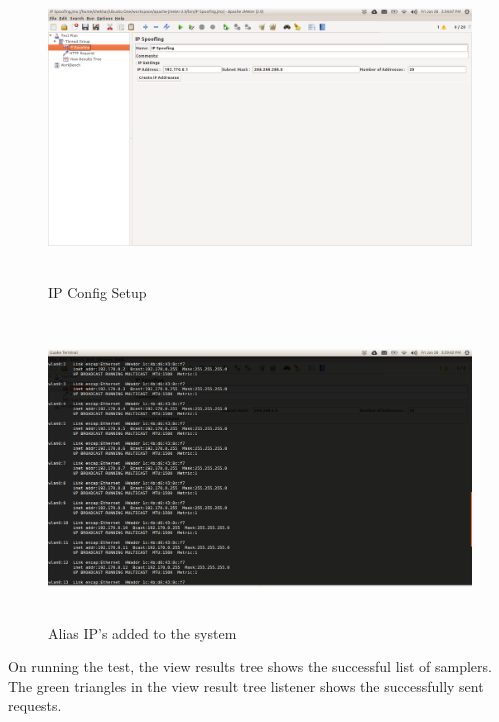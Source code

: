 \documentclass[12pt]{book}
\begin{document}
   \begin{figure}[H]
   \centering
   \includegraphics[width=15cm, height=8cm]{images/ip_83}
   \caption{IP Config Setup\label{fig:fig86_JMeter}}
  \end{figure}
  
  
   \begin{figure}[H]
   \centering
   \includegraphics[width=15cm, height=8cm]{images/ip_84}
   \caption{Alias IP's added to the system\label{fig:fig87_JMeter}}
  \end{figure}
  
On running the test, the view results tree shows the successful list of samplers. The green triangles in the view result tree 
listener shows the successfully sent requests. 
\end{document}
